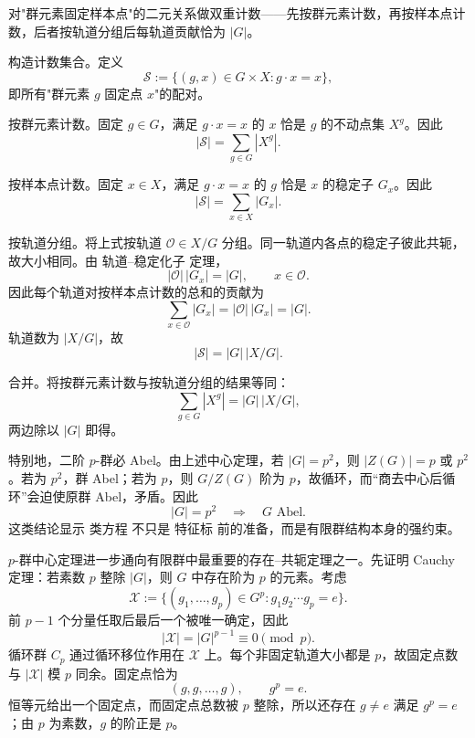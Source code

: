 对"群元素固定样本点"的二元关系做双重计数——先按群元素计数，再按样本点计数，后者按轨道分组后每轨道贡献恰为 $|G|$。

构造计数集合。定义
\begin{equation*}
 \mathcal S
 :=\{(g,x)\in G\times X:g\cdot x=x\},
\end{equation*}
即所有"群元素 $g$ 固定点 $x$"的配对。

按群元素计数。固定 $g\in G$，满足 $g\cdot x=x$ 的 $x$ 恰是 $g$ 的不动点集 $X^g$。因此
\begin{equation*}
 |\mathcal S|
 =\sum_{g\in G}|X^g|.
\end{equation*}

按样本点计数。固定 $x\in X$，满足 $g\cdot x=x$ 的 $g$ 恰是 $x$ 的稳定子 $G_x$。因此
\begin{equation*}
 |\mathcal S|
 =\sum_{x\in X}|G_x|.
\end{equation*}

按轨道分组。将上式按轨道 $\mathcal O\in X/G$ 分组。同一轨道内各点的稳定子彼此共轭，故大小相同。由 轨道--稳定化子 定理，
\begin{equation*}
 |\mathcal O|\,|G_x|=|G|,
 \qquad x\in\mathcal O.
\end{equation*}
因此每个轨道对按样本点计数的总和的贡献为
\begin{equation*}
 \sum_{x\in\mathcal O}|G_x|
 =|\mathcal O|\,|G_x|
 =|G|.
\end{equation*}
轨道数为 $|X/G|$，故
\begin{equation*}
 |\mathcal S|=|G|\,|X/G|.
\end{equation*}

合并。将按群元素计数与按轨道分组的结果等同：
\begin{equation*}
 \sum_{g\in G}|X^g|=|G|\,|X/G|,
\end{equation*}
两边除以 $|G|$ 即得。

特别地，二阶 $p$-群必 Abel。由上述中心定理，若 $|G|=p^2$，则 $|Z(G)|=p$ 或 $p^2$。若为 $p^2$，群 Abel；若为 $p$，则 $G/Z(G)$ 阶为 $p$，故循环，而“商去中心后循环”会迫使原群 Abel，矛盾。因此
\[
{|G|=p^2\quad\Longrightarrow\quad G\text{ Abel}.}
\]
这类结论显示 类方程 不只是 特征标 前的准备，而是有限群结构本身的强约束。

$p$-群中心定理进一步通向有限群中最重要的存在--共轭定理之一。先证明 Cauchy 定理：若素数 $p$ 整除 $|G|$，则 $G$ 中存在阶为 $p$ 的元素。考虑
\[
\mathcal X:=\{(g_1,\ldots,g_p)\in G^p:g_1g_2\cdots g_p=e\}.
\]
前 $p-1$ 个分量任取后最后一个被唯一确定，因此
\[
|\mathcal X|=|G|^{p-1}\equiv0\pmod p.
\]
循环群 $C_p$ 通过循环移位作用在 $\mathcal X$ 上。每个非固定轨道大小都是 $p$，故固定点数与 $|\mathcal X|$ 模 $p$ 同余。固定点恰为
\[
(g,g,\ldots,g),\qquad g^p=e.
\]
恒等元给出一个固定点，而固定点总数被 $p$ 整除，所以还存在 $g\neq e$ 满足 $g^p=e$；由 $p$ 为素数，$g$ 的阶正是 $p$。

